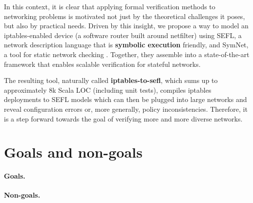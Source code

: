 In this context, it is clear that applying formal verification methods to
networking problems is motivated not just by the theoretical challenges it
poses, but also by practical needs.  Driven by this insight, we propose a way
to model an iptables-enabled device (a software router built around netfilter)
using SEFL, a network
description language that is \textbf{symbolic execution} friendly, and SymNet,
a tool for static network checking \cite{stoenescu2016symnet,
stoenescu2013symnet}.  Together, they assemble into a state-of-the-art
framework that enables scalable verification for stateful networks.

The resulting tool, naturally called \textbf{iptables-to-sefl}, which sums up
to approximately 8k Scala LOC (including unit tests), compiles iptables
deployments to SEFL models which can then be plugged into large networks and
reveal configuration errors or, more generally, policy inconsistencies.
Therefore, it is a step forward towards the goal of verifying more and more
diverse networks.

\section{Goals and non-goals}

\paragraph{Goals.}

\paragraph{Non-goals.}

